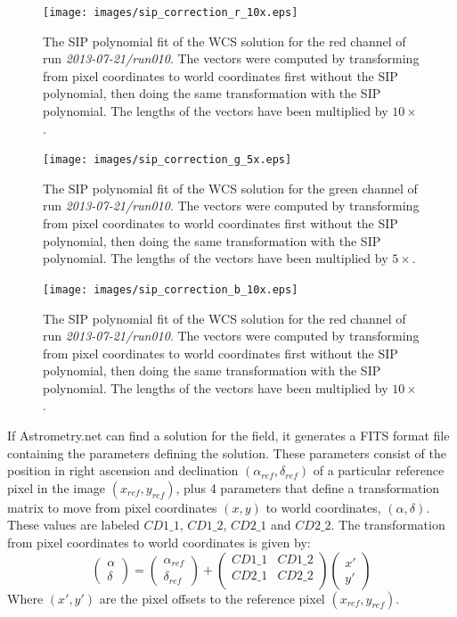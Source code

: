\begin{figure}
  \centering
  \texttt{[image: images/sip\_correction\_r\_10x.eps]}
  \caption{The SIP polynomial fit of the WCS solution for the red channel of run \emph{2013-07-21/run010}. The vectors were computed by transforming from pixel coordinates to world coordinates first without the SIP polynomial, then doing the same transformation with the SIP polynomial. The lengths of the vectors have been multiplied by $10\times$.}
\label{fig:sipred}
\end{figure}

\begin{figure}
  \centering
  \texttt{[image: images/sip\_correction\_g\_5x.eps]}
  \caption{The SIP polynomial fit of the WCS solution for the green channel of run \emph{2013-07-21/run010}. The vectors were computed by transforming from pixel coordinates to world coordinates first without the SIP polynomial, then doing the same transformation with the SIP polynomial. The lengths of the vectors have been multiplied by $5\times$.}
\label{fig:sipgreen}
\end{figure}

\begin{figure}
  \centering
  \texttt{[image: images/sip\_correction\_b\_10x.eps]}
  \caption{The SIP polynomial fit of the WCS solution for the red channel of run \emph{2013-07-21/run010}. The vectors were computed by transforming from pixel coordinates to world coordinates first without the SIP polynomial, then doing the same transformation with the SIP polynomial. The lengths of the vectors have been multiplied by $10\times$.}
\label{fig:sipblue}
\end{figure}

If Astrometry.net can find a solution for the field, it generates a FITS format file containing the parameters defining the solution. These parameters consist of the position in right ascension and declination $(\alpha_{ref}, \delta_{ref})$ of a particular reference pixel in the image $(x_{ref}, y_{ref})$, plus 4 parameters that define a transformation matrix to move from pixel coordinates $(x, y)$ to world coordinates, $(\alpha, \delta)$. These values are labeled $CD1\_1$, $CD1\_2$, $CD2\_1$ and $CD2\_2$. The transformation from pixel coordinates to world coordinates is given by: \begin{equation} 
\left(\begin{array}{c} \alpha \\ \delta \end{array} \right) = \left(\begin{array}{c} \alpha_{ref} \\ \delta_{ref} \end{array} \right) + 
\left(\begin{array}{cc}  CD1\_1 & CD1\_2 \\ CD2\_1  & CD2\_2 \\ \end{array}\right) 
\left(\begin{array}{c} x' \\ y' \end{array} \right)
\end{equation}
Where $(x', y')$ are the pixel offsets to the reference pixel $(x_{ref}, y_{ref})$.


